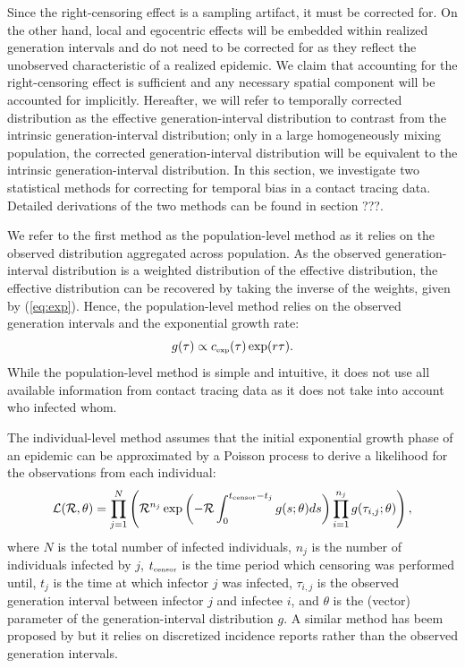 \documentclass[12pt]{article}
\newcommand{\eref}[1]{(\ref{eq:#1})}
\newcommand{\RR}{\ensuremath{{\mathcal R}}}
\newcommand{\tsub}[2]{#1_{{\textrm{\tiny #2}}}}
\begin{document}
Since the right-censoring effect is a sampling artifact, it must be corrected for.
On the other hand, local and egocentric effects will be embedded within realized generation intervals and do not need to be corrected for as they reflect the unobserved characteristic of a realized epidemic.
We claim that accounting for the right-censoring effect is sufficient and any necessary spatial component will be accounted for implicitly.
Hereafter, we will refer to temporally corrected distribution as the effective generation-interval distribution to contrast from the intrinsic generation-interval distribution; only in a large homogeneously mixing population, the corrected generation-interval distribution will be equivalent to the intrinsic generation-interval distribution.
In this section, we investigate two statistical methods for correcting for temporal bias in a contact tracing data.
Detailed derivations of the two methods can be found in section ???.

We refer to the first method as the population-level method as it relies on the observed distribution aggregated across population.
As the observed generation-interval distribution is a weighted distribution of the effective distribution, the effective distribution can be recovered by taking the inverse of the weights, given by \eref{exp}.
Hence, the population-level method relies on the observed generation intervals and the exponential growth rate:
\begin{equation}
g(\tau) \propto \tsub{c}{exp}(\tau) \exp(r\tau).
\end{equation}
While the population-level method is simple and intuitive, it does not use all available information from contact tracing data as it does not take into account who infected whom.

The individual-level method assumes that the initial exponential growth phase of an epidemic can be approximated by a Poisson process to derive a likelihood for the observations from each individual:
\begin{equation}
\mathcal{L}(\RR, \theta) = \prod_{j=1}^N \left(\RR^{n_j} \exp \left(- \RR \int_0^{\tsub{t}{censor} - t_j} g(s;\theta) ds \right) \prod_{i=1}^{n_j} g(\tau_{i, j}; \theta) \right),
\end{equation}
where $N$ is the total number of infected individuals, $n_j$ is the number of individuals infected by $j$, $\tsub{t}{censor}$ is the time period which censoring was performed until, $t_j$ is the time at which infector $j$ was infected, $\tau_{i,j}$ is the observed generation interval between infector $j$ and infectee $i$, and $\theta$ is the (vector) parameter of the generation-interval distribution $g$.
A similar method has beem proposed by \cite{forsberg2008likelihood} but it relies on discretized incidence reports rather than the observed generation intervals.
\end{document}
